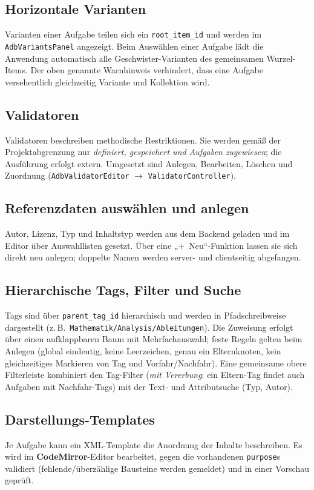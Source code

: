 \documentclass[11pt,a4paper]{article}
\begin{document}
\subsection{Horizontale Varianten}
Varianten einer Aufgabe teilen sich ein \texttt{root\_item\_id} und werden im
\texttt{AdbVariantsPanel} angezeigt. Beim Auswählen einer Aufgabe lädt die
Anwendung automatisch alle Geschwister-Varianten des gemeinsamen Wurzel-Items.
Der oben genannte Warnhinweis verhindert, dass eine Aufgabe versehentlich
gleichzeitig Variante und Kollektion wird.

\subsection{Validatoren}
Validatoren beschreiben methodische Restriktionen. Sie werden gemäß der
Projektabgrenzung nur \emph{definiert, gespeichert und Aufgaben zugewiesen}; die
Ausführung erfolgt extern. Umgesetzt sind Anlegen, Bearbeiten, Löschen und
Zuordnung (\texttt{AdbValidatorEditor} $\rightarrow$ \texttt{ValidatorController}).

\subsection{Referenzdaten auswählen und anlegen}
Autor, Lizenz, Typ und Inhaltstyp werden aus dem Backend geladen und im Editor
über Auswahllisten gesetzt. Über eine „+~Neu``-Funktion lassen sie sich direkt
neu anlegen; doppelte Namen werden server- und clientseitig abgefangen.

\subsection{Hierarchische Tags, Filter und Suche}
Tags sind über \texttt{parent\_tag\_id} hierarchisch und werden in
Pfadschreibweise dargestellt (z.\,B.\ \texttt{Mathematik/Analysis/Ableitungen}).
Die Zuweisung erfolgt über einen aufklappbaren Baum mit Mehrfachauswahl; feste
Regeln gelten beim Anlegen (global eindeutig, keine Leerzeichen, genau ein
Elternknoten, kein gleichzeitiges Markieren von Tag und Vorfahr/Nachfahr). Eine
gemeinsame obere Filterleiste kombiniert den Tag-Filter (\emph{mit Vererbung}:
ein Eltern-Tag findet auch Aufgaben mit Nachfahr-Tags) mit der Text- und
Attributsuche (Typ, Autor).

\subsection{Darstellungs-Templates}
Je Aufgabe kann ein XML-Template die Anordnung der Inhalte beschreiben. Es wird im
\textbf{CodeMirror}-Editor bearbeitet, gegen die vorhandenen \texttt{purpose}s
validiert (fehlende/überzählige Bausteine werden gemeldet) und in einer Vorschau
geprüft.
\end{document}
